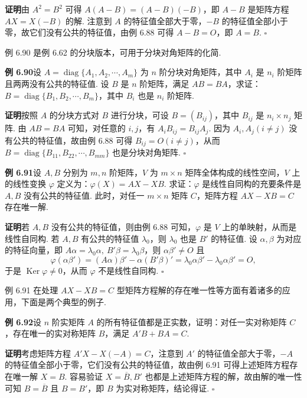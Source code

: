 \documentclass[UTF8, 12pt, fontset=fandol, oneside]{ctexart}
\begin{document}
\noindent\textbf{证明}\quad 由 $A^2=B^2$ 可得 $A(A-B)=(A-B)(-B)$，即 $A-B$ 是矩阵方程 $AX=X(-B)$ 的解. 注意到 $A$ 的特征值全部大于零，$-B$ 的特征值全部小于零，故它们没有公共的特征值，由例 6.88 可得 $A-B=O$，即 $A=B$. $\square$

例 6.90 是例 6.62 的分块版本，可用于分块对角矩阵的化简.

\noindent\textbf{例 6.90}\quad 设 $A=\operatorname{diag}\{A_1,A_2,\cdots,A_m\}$ 为 $n$ 阶分块对角矩阵，其中 $A_i$ 是 $n_i$ 阶矩阵且两两没有公共的特征值. 设 $B$ 是 $n$ 阶矩阵，满足 $AB=BA$，求证：$B=\operatorname{diag}\{B_1,B_2,\cdots,B_m\}$，其中 $B_i$ 也是 $n_i$ 阶矩阵.

\noindent\textbf{证明}\quad 按照 $A$ 的分块方式对 $B$ 进行分块，可设 $B=(B_{ij})$，其中 $B_{ij}$ 是 $n_i\times n_j$ 矩阵. 由 $AB=BA$ 可知，对任意的 $i,j$，有 $A_iB_{ij}=B_{ij}A_j$. 因为 $A_i,A_j(i\ne j)$ 没有公共的特征值，故由例 6.88 可得 $B_{ij}=O(i\ne j)$，从而 $B=\operatorname{diag}\{B_{11},B_{22},\cdots,B_{mm}\}$ 也是分块对角矩阵. $\square$

\noindent\textbf{例 6.91}\quad 设 $A,B$ 分别为 $m,n$ 阶矩阵，$V$ 为 $m\times n$ 矩阵全体构成的线性空间，$V$ 上的线性变换 $\varphi$ 定义为：$\varphi(X)=AX-XB$. 求证：$\varphi$ 是线性自同构的充要条件是 $A,B$ 没有公共的特征值. 此时，对任一 $m\times n$ 矩阵 $C$，矩阵方程 $AX-XB=C$ 存在唯一解.

\noindent\textbf{证明}\quad 若 $A,B$ 没有公共的特征值，则由例 6.88 可知，$\varphi$ 是 $V$ 上的单映射，从而是线性自同构. 若 $A,B$ 有公共的特征值 $\lambda_0$，则 $\lambda_0$ 也是 $B'$ 的特征值. 设 $\alpha,\beta$ 为对应的特征向量，即 $A\alpha=\lambda_0\alpha,\ B'\beta=\lambda_0\beta$，则 $\alpha\beta'\ne O$ 且
\[
\varphi(\alpha\beta')=(A\alpha)\beta'-\alpha(B'\beta)'=\lambda_0\alpha\beta'-\lambda_0\alpha\beta'=O,
\]
于是 $\operatorname{Ker}\varphi\ne 0$，从而 $\varphi$ 不是线性自同构. $\square$

例 6.91 在处理 $AX-XB=C$ 型矩阵方程解的存在唯一性等方面有着诸多的应用，下面是两个典型的例子.

\noindent\textbf{例 6.92}\quad 设 $n$ 阶实矩阵 $A$ 的所有特征值都是正实数，证明：对任一实对称矩阵 $C$，存在唯一的实对称矩阵 $B$，满足 $A'B+BA=C$.

\noindent\textbf{证明}\quad 考虑矩阵方程 $A'X-X(-A)=C$，注意到 $A'$ 的特征值全部大于零，$-A$ 的特征值全部小于零，它们没有公共的特征值，故由例 6.91 可得上述矩阵方程存在唯一解 $X=B$. 容易验证 $X=\overline{B},B'$ 也都是上述矩阵方程的解，故由解的唯一性可知 $B=\overline{B}$ 且 $B=B'$，即 $B$ 为实对称矩阵，结论得证. $\square$
\end{document}
